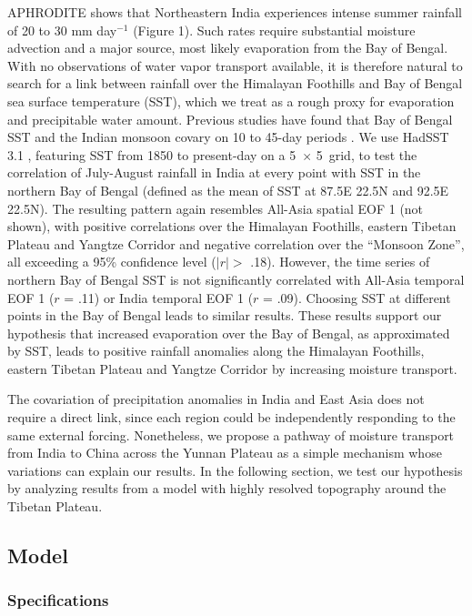 \documentclass[12pt]{article}
\begin{document}
	APHRODITE shows that Northeastern India experiences intense summer rainfall of 20 to 30 mm day$^{-1}$ (Figure 1). Such rates require substantial moisture advection and a major source, most likely evaporation from the Bay of Bengal. With no observations of water vapor transport available, it is therefore natural to search for a link between rainfall over the Himalayan Foothills and Bay of Bengal sea surface temperature (SST), which we treat as a rough proxy for evaporation and precipitable water amount. Previous studies have found that Bay of Bengal SST and the Indian monsoon covary on 10 to 45-day periods \citep{Vecchi2002,Han2006}. We use HadSST 3.1 \citep{Kennedy2011a,Kennedy2011}, featuring SST from 1850 to present-day on a 5\textdegree\ $\times$ 5\textdegree\ grid, to test the correlation of July-August rainfall in India at every point with SST in the northern Bay of Bengal (defined as the mean of SST at 87.5\textdegree E 22.5\textdegree N and 92.5\textdegree E 22.5\textdegree N). The resulting pattern again resembles All-Asia spatial EOF 1 (not shown), with positive correlations over the Himalayan Foothills, eastern Tibetan Plateau and Yangtze Corridor and negative correlation over the ``Monsoon Zone'', all exceeding a 95\% confidence level ($\lvert r \rvert >$ .18). However, the time series of northern Bay of Bengal SST is not significantly correlated with All-Asia temporal EOF 1 ($r$ = .11) or India temporal EOF 1 ($r$ = .09). Choosing SST at different points in the Bay of Bengal leads to similar results. These results support our hypothesis that increased evaporation over the Bay of Bengal, as approximated by SST, leads to positive rainfall anomalies along the Himalayan Foothills, eastern Tibetan Plateau and Yangtze Corridor by increasing moisture transport.
		
	The covariation of precipitation anomalies in India and East Asia does not require a direct link, since each region could be independently responding to the same external forcing. Nonetheless, we propose a pathway of moisture transport from India to China across the Yunnan Plateau as a simple mechanism whose variations can explain our results.  In the following section, we test our hypothesis by analyzing results from a model with highly resolved topography around the Tibetan Plateau.

\subsection{Model}

\subsubsection{Specifications}
	
\end{document}
